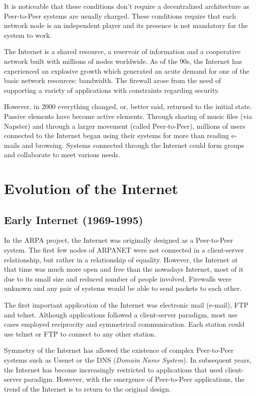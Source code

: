 It is noticeable that these conditions don't require a decentralized
architecture as Peer-to-Peer systems are usually charged. These conditions
require that each network node is an independent player and its presence
is not mandatory for the system to work.

The Internet is a shared resource, a reservoir of information and a
cooperative network built with millions of nodes worldwide. As of the 90s, the
Internet has experienced an explosive growth which generated an acute demand
for one of the basic network resources: bandwidth. The firewall arose from the
need of supporting a variety of applications with constraints regarding
security.

However, in 2000 everything changed, or, better said, returned to the initial
state. Passive elements have become active elements. Through sharing of music
files (via Napster) and through a larger movement (called Peer-to-Peer),
millions of users connected to the Internet began using their systems
for more than reading e-mails and browsing. Systems connected through the
Internet could form groups and collaborate to meet various needs.

\section{Evolution of the Internet}
\label{sec:p2p-systems:evolution-internet}

\subsection{Early Internet (1969-1995)}

In the ARPA project, the Internet was originally designed as a Peer-to-Peer
system. The first few nodes of ARPANET were not connected in a client-server
relationship, but rather in a relationship of equality. However, the Internet
at that time was much more open and free than the nowadays Internet, most of
it due to its small size and reduced number of people involved.  Firewalls
were unknown and any pair of systems would be able to send packets to each
other.

The first important application of the Internet was electronic mail (e-mail),
FTP and telnet. Although applications followed a client-server paradigm,
most use cases employed reciprocity and symmetrical communication. Each
station could use telnet or FTP to connect to any other station.

Symmetry of the Internet has allowed the existence of complex Peer-to-Peer
systems such as Usenet or the DNS (\textit{Domain Name System}). In subsequent
years, the Internet has become increasingly restricted to applications
that used client-server paradigm. However, with the emergence of Peer-to-Peer
applications, the trend of the Internet is to return to the original design.


